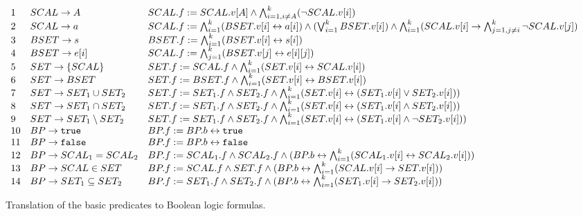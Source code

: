 \begin{figure*}[t]
\[
\begin{array}{lll}
1 & SCAL \rightarrow  A &
        SCAL.f := SCAL.v[A]
        \wedge \bigwedge_{i=1, i \neq A}^k (\neg SCAL.v[i]) \\
2 & SCAL \rightarrow  a &
        SCAL.f := \bigwedge_{i=1}^k (BSET.v[i] \leftrightarrow a[i])
        \wedge (\bigvee_{i=1}^k BSET.v[i]) \wedge \bigwedge_{i=1}^k
        (SCAL.v[i] \rightarrow \bigwedge_{j=1,j\neq i}^k \neg SCAL.v[j])  \\
3 & BSET \rightarrow  s &
        BSET.f := \bigwedge_{i=1}^k (BSET.v[i] \leftrightarrow s[i]) \\
4 & BSET \rightarrow  e[i] &
        SCAL.f := \bigwedge_{j=1}^k (BSET.v[j] \leftrightarrow e[i][j]) \\
5 & SET  \rightarrow  \{ SCAL \} &
        SET.f := SCAL.f \wedge \bigwedge_{i=1}^k (SET.v[i] \leftrightarrow SCAL.v[i]) \\
6 & SET  \rightarrow  BSET &
        SET.f := BSET.f \wedge \bigwedge_{i=1}^k (SET.v[i] \leftrightarrow BSET.v[i]) \\
7 & SET  \rightarrow  SET_1 \cup SET_2 &
        SET.f := SET_1.f \wedge SET_2.f \wedge
        \bigwedge_{i=1}^k (SET.v[i] \leftrightarrow (SET_1.v[i] \vee SET_2.v[i])) \\
8 & SET  \rightarrow SET_1 \cap SET_2 &
        SET.f := SET_1.f \wedge SET_2.f \wedge
        \bigwedge_{i=1}^k (SET.v[i] \leftrightarrow (SET_1.v[i] \wedge SET_2.v[i])) \\
9 & SET  \rightarrow SET_1 \setminus SET_2 &
        SET.f := SET_1.f \wedge SET_2.f \wedge
        \bigwedge_{i=1}^k (SET.v[i] \leftrightarrow (SET_1.v[i] \wedge \neg SET_2.v[i])) \\
10 & BP \rightarrow  \texttt{true} &
        BP.f := BP.b \leftrightarrow \texttt{true} \\
11 & BP \rightarrow  \texttt{false} &
        BP.f := BP.b \leftrightarrow \texttt{false} \\
12 & BP \rightarrow  SCAL_1 = SCAL_2 &
        BP.f := SCAL_1.f \wedge SCAL_2.f \wedge
        (BP.b \leftrightarrow \bigwedge_{i=1}^k (SCAL_1.v[i] \leftrightarrow SCAL_2.v[i])) \\
13 & BP \rightarrow  SCAL \in SET &
        BP.f := SCAL.f \wedge SET.f \wedge
        (BP.b \leftrightarrow \bigwedge_{i=1}^k (SCAL.v[i] \rightarrow SET.v[i])) \\
14 & BP \rightarrow  SET_1 \subseteq SET_2 &
        BP.f := SET_1.f \wedge SET_2.f \wedge
        (BP.b \leftrightarrow \bigwedge_{i=1}^k (SET_1.v[i] \rightarrow SET_2.v[i]))
\end{array}
\]
\caption{Translation of the basic predicates to Boolean logic formulas.}
\label{fig:BP}
\end{figure*}


